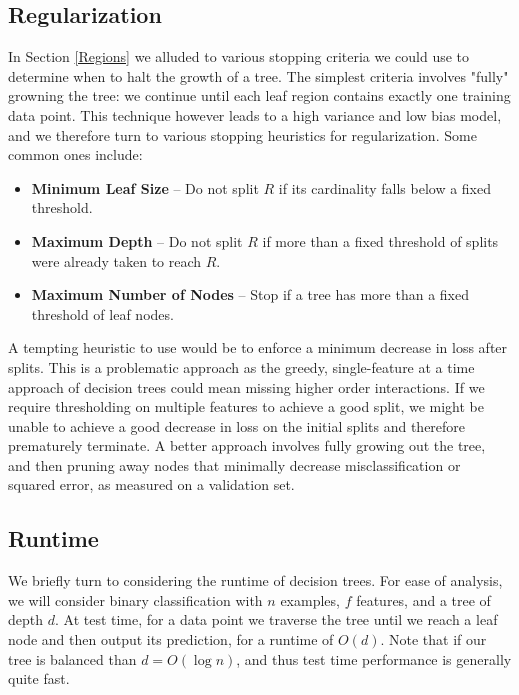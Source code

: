 \documentclass{article}
\begin{document}
\subsection{Regularization}

In Section \ref{Regions} we alluded to various stopping criteria we could use to determine when to halt the growth of a tree.  The simplest criteria involves "fully" growning the tree: we continue until each leaf region contains exactly one training data point.  This technique however leads to a high variance and low bias model, and we therefore turn to various stopping heuristics for regularization.  Some common ones include:

\begin{itemize}
	\item {\bf Minimum Leaf Size} -- Do not split $R$ if its cardinality falls below a fixed threshold.
	\item {\bf Maximum Depth} -- Do not split $R$ if more than a fixed threshold of splits were already taken to reach $R$.
	\item {\bf Maximum Number of Nodes} -- Stop if a tree has more than a fixed threshold of leaf nodes.
\end{itemize}

A tempting heuristic to use would be to enforce a minimum decrease in loss after splits.  This is a problematic approach as the greedy, single-feature at a time approach of decision trees could mean missing higher order interactions.  If we require thresholding on multiple features to achieve a good split, we might be unable to achieve a good decrease in loss on the initial splits and therefore prematurely terminate.  A better approach involves fully growing out the tree, and then pruning away nodes that minimally decrease misclassification or squared error, as measured on a validation set. 

\subsection{Runtime}

We briefly turn to considering the runtime of decision trees.  For ease of analysis, we will consider binary classification with $n$ examples, $f$ features, and a tree of depth $d$.   At test time, for a data point we traverse the tree until we reach a leaf node and then output its prediction, for a runtime of $O(d)$.  Note that if our tree is balanced than $d = O(\log{n})$, and thus test time performance is generally quite fast.
\end{document}

